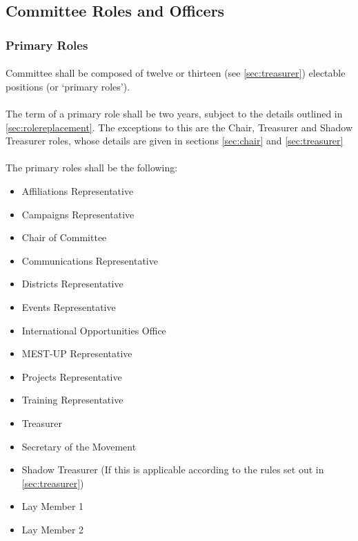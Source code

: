 \documentclass[a4paper, 11pt]{report}
\begin{document}
\subsection{Committee Roles and Officers}
\subsubsection{Primary Roles}
\label{sec:primaryroles}
\paragraph{} Committee shall be composed of twelve or thirteen (see \ref{sec:treasurer}) electable positions (or `primary roles').

\paragraph{} The term of a primary role shall be two years, subject to the details outlined in \ref{sec:rolereplacement}.  The exceptions to this are the Chair, Treasurer and Shadow Treasurer roles, whose details are given in sections \ref{sec:chair} and \ref{sec:treasurer}

\paragraph{} The primary roles shall be the following:

\begin{itemize}
\item Affiliations Representative
\item Campaigns Representative
\item Chair of Committee
\item Communications Representative
\item Districts Representative
\item Events Representative
\item International Opportunities Office
\item MEST-UP Representative
\item Projects Representative
\item Training Representative
\item Treasurer
\item Secretary of the Movement
\item Shadow Treasurer (If this is applicable according to the rules set out in \autoref{sec:treasurer})
\item Lay Member 1
\item Lay Member 2
\end{itemize}
\end{document}
